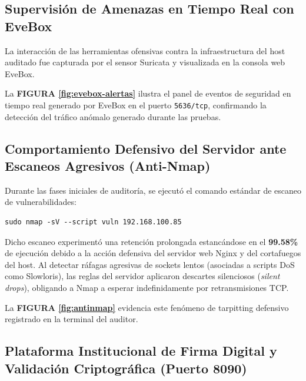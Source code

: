 \subsection{Supervisión de Amenazas en Tiempo Real con EveBox}

La interacción de las herramientas ofensivas contra la infraestructura del host auditado fue capturada por el sensor Suricata y visualizada en la consola web EveBox.

La \textbf{FIGURA \ref{fig:evebox-alertas}} ilustra el panel de eventos de seguridad en tiempo real generado por EveBox en el puerto \texttt{5636/tcp}, confirmando la detección del tráfico anómalo generado durante las pruebas.


\subsection{Comportamiento Defensivo del Servidor ante Escaneos Agresivos (Anti-Nmap)}

Durante las fases iniciales de auditoría, se ejecutó el comando estándar de escaneo de vulnerabilidades:
\begin{lstlisting}[style=terminal, caption={Comando Agresivo Inicial de Nmap}, label={lst:cmd-agresivo}]
sudo nmap -sV --script vuln 192.168.100.85
\end{lstlisting}

Dicho escaneo experimentó una retención prolongada estancándose en el \textbf{99.58\%} de ejecución debido a la acción defensiva del servidor web Nginx y del cortafuegos del host. Al detectar ráfagas agresivas de sockets lentos (asociadas a scripts DoS como Slowloris), las reglas del servidor aplicaron descartes silenciosos (\textit{silent drops}), obligando a Nmap a esperar indefinidamente por retransmisiones TCP.

La \textbf{FIGURA \ref{fig:antinmap}} evidencia este fenómeno de tarpitting defensivo registrado en la terminal del auditor.


\subsection{Plataforma Institucional de Firma Digital y Validación Criptográfica (Puerto 8090)}

